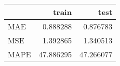 \begin{tabular}{lrr}
\toprule
{} &      train &       test \\
\midrule
MAE  &   0.888288 &   0.876783 \\
MSE  &   1.392865 &   1.340513 \\
MAPE &  47.886295 &  47.266077 \\
\bottomrule
\end{tabular}
